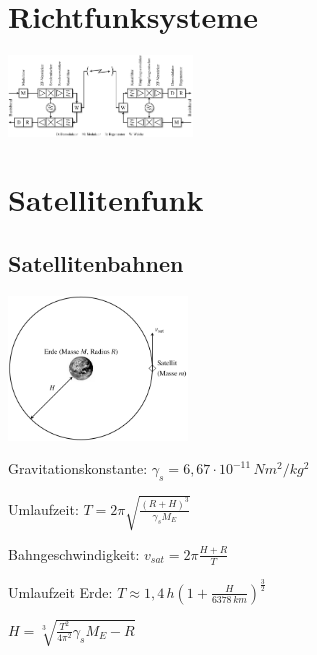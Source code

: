 \documentclass[german]{latex4ei/latex4ei_sheet}
\begin{document}
\section{Richtfunksysteme}
    \begin{sectionbox}
        \item \includegraphics[width=185px]{img/Richtfunk.png}
    \end{sectionbox}
\section{Satellitenfunk}
    \begin{sectionbox}{\subsection{Satellitenbahnen}}
       \item \includegraphics[width=180px]{img/Satellitenumlauf.png}
       \item Gravitationskonstante: $\gamma_s = 6,67\cdot 10^{-11}\, Nm^2/kg^2$
       \item Umlaufzeit: $T = 2\pi \sqrt{\frac{(R+H)^3}{\gamma_s M_E}}$
       \item Bahngeschwindigkeit: $v_{sat} = 2\pi \frac{H+R}{T}$
       \item Umlaufzeit Erde: $T \approx 1,4\,h \left( 1+\frac{H}{6378\,km}\right)^{\frac{3}{2}}$
       \item $H = \sqrt[3]{\frac{T^2}{4\pi^2}\gamma_s M_E - R}$
    \end{sectionbox}
\end{document}
